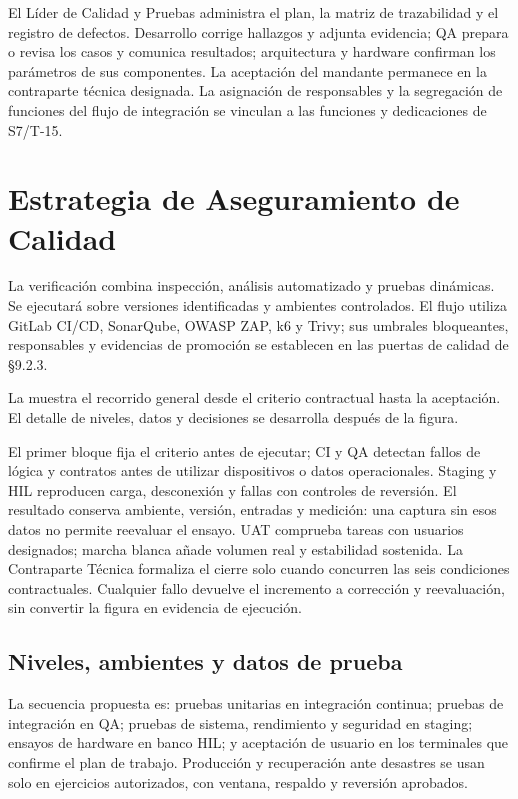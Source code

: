El Líder de Calidad y Pruebas administra el plan, la matriz de trazabilidad y el registro de defectos. Desarrollo corrige hallazgos y adjunta evidencia; QA prepara o revisa los casos y comunica resultados; arquitectura y hardware confirman los parámetros de sus componentes. La aceptación del mandante permanece en la contraparte técnica designada. La asignación de responsables y la segregación de funciones del flujo de integración se vinculan a las funciones y dedicaciones de S7/T-15.

\section{Estrategia de Aseguramiento de Calidad}\label{sec:9-estrategia}

La verificación combina inspección, análisis automatizado y pruebas dinámicas. Se ejecutará sobre versiones identificadas y ambientes controlados. El flujo utiliza GitLab CI/CD, SonarQube, OWASP ZAP, k6 y Trivy; sus umbrales bloqueantes, responsables y evidencias de promoción se establecen en las puertas de calidad de §9.2.3.


La  muestra el recorrido general desde el criterio contractual hasta la aceptación. El detalle de niveles, datos y decisiones se desarrolla después de la figura.


El primer bloque fija el criterio antes de ejecutar; CI y QA detectan fallos de lógica y contratos antes de utilizar dispositivos o datos operacionales. Staging y HIL reproducen carga, desconexión y fallas con controles de reversión. El resultado conserva ambiente, versión, entradas y medición: una captura sin esos datos no permite reevaluar el ensayo. UAT comprueba tareas con usuarios designados; marcha blanca añade volumen real y estabilidad sostenida. La Contraparte Técnica formaliza el cierre solo cuando concurren las seis condiciones contractuales. Cualquier fallo devuelve el incremento a corrección y reevaluación, sin convertir la figura en evidencia de ejecución.

\subsection{Niveles, ambientes y datos de prueba}\label{sec:9-ambientes}

La secuencia propuesta es: pruebas unitarias en integración continua; pruebas de integración en QA; pruebas de sistema, rendimiento y seguridad en staging; ensayos de hardware en banco HIL; y aceptación de usuario en los terminales que confirme el plan de trabajo. Producción y recuperación ante desastres se usan solo en ejercicios autorizados, con ventana, respaldo y reversión aprobados.

